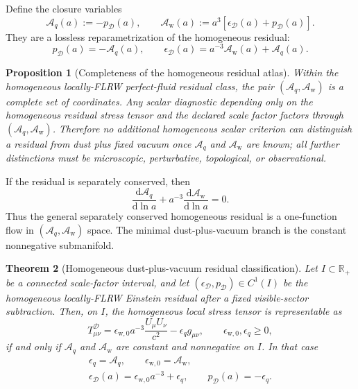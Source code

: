 \documentclass[
  aps,
  prd,
  reprint,
  superscriptaddress,
  floatfix,
  nofootinbib,
  longbibliography
]{revtex4-2}
\theoremstyle{plain}
\newtheorem{theorem}{Theorem}
\newtheorem{proposition}[theorem]{Proposition}
\theoremstyle{definition}
\theoremstyle{remark}
\newcommand{\dd}{\mathrm d}
\newcommand{\D}{\mathcal D}
\newcommand{\wind}{\mathrm w}
\newcommand{\Aq}{\mathcal A_q}
\newcommand{\Aw}{\mathcal A_{\mathrm w}}
\newcommand{\R}{\mathbb R}
\newcommand{\eps}{\epsilon}
\begin{document}
Define the closure variables
\begin{equation}
\boxed{
\Aq(a):=-p_\D(a),
\qquad
\Aw(a):=a^3[\eps_\D(a)+p_\D(a)] .
}
\label{eq:closure_pair_v5}
\end{equation}
They are a lossless reparametrization of the homogeneous residual:
\begin{equation}
p_\D(a)=-\Aq(a),
\qquad
\eps_\D(a)=a^{-3}\Aw(a)+\Aq(a) .
\label{eq:atlas_inverse_v5}
\end{equation}

\begin{proposition}[Completeness of the homogeneous residual atlas]
\label{prop:atlas_completeness_v26}
Within the homogeneous locally-FLRW perfect-fluid residual class, the pair
\((\Aq,\Aw)\) is a complete set of coordinates.  Any scalar diagnostic depending
only on the homogeneous residual stress tensor and the declared scale factor
factors through \((\Aq,\Aw)\).  Therefore no additional homogeneous scalar
criterion can distinguish a residual from dust plus fixed vacuum once
\(\Aq\) and \(\Aw\) are known; all further distinctions must be microscopic,
perturbative, topological, or observational.
\end{proposition}

If the residual is separately conserved, then
\begin{equation}
\frac{\dd\Aq}{\dd\ln a}+a^{-3}\frac{\dd\Aw}{\dd\ln a}=0 .
\label{eq:atlas_flow_v5}
\end{equation}
Thus the general separately conserved homogeneous residual is a one-function
flow in \((\Aq,\Aw)\) space.  The minimal dust-plus-vacuum branch is the
constant nonnegative submanifold.

\begin{theorem}[Homogeneous dust-plus-vacuum residual classification]
\label{thm:minimal_closure_v5}
Let \(I\subset\R_+\) be a connected scale-factor interval, and let
\((\eps_\D,p_\D)\in C^1(I)\) be the homogeneous locally-FLRW Einstein residual
after a fixed visible-sector subtraction.  Then, on $I$, the homogeneous local
stress tensor is representable as
\begin{equation}
T^\D_{\mu\nu}
=
\eps_{\wind,0}a^{-3}\frac{U_\mu U_\nu}{c^2}
-
\eps_q g_{\mu\nu},
\qquad
\eps_{\wind,0},\eps_q\ge0,
\label{eq:minimal_tensor_v5}
\end{equation}
if and only if \(\Aq\) and \(\Aw\) are constant and nonnegative on \(I\).  In
that case
\begin{equation}
\begin{gathered}
\eps_q=\Aq,\qquad \eps_{\wind,0}=\Aw,\\
\eps_\D(a)=\eps_{\wind,0}a^{-3}+\eps_q,
\qquad
p_\D(a)=-\eps_q .
\end{gathered}
\label{eq:closure_solution_v5}
\end{equation}
\end{theorem}
\end{document}
